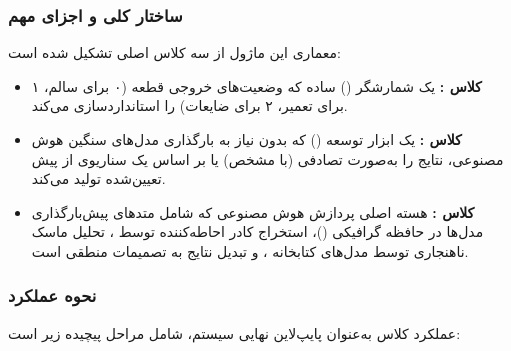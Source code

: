 \documentclass{article}
\begin{document}
\subsubsection{ساختار کلی و اجزای مهم}
معماری این ماژول از سه کلاس اصلی تشکیل شده است:

\begin{itemize}
	\item \textbf{کلاس :} یک شمارشگر () ساده که وضعیت‌های خروجی قطعه (۰ برای سالم، ۱ برای تعمیر، ۲ برای ضایعات) را استانداردسازی می‌کند.
	\item \textbf{کلاس :} یک ابزار توسعه () که بدون نیاز به بارگذاری مدل‌های سنگین هوش مصنوعی، نتایج را به‌صورت تصادفی (با  مشخص) یا بر اساس یک سناریوی از پیش تعیین‌شده تولید می‌کند.
	\item \textbf{کلاس :} هسته اصلی پردازش هوش مصنوعی که شامل متدهای پیش‌بارگذاری مدل‌ها در حافظه گرافیکی ()، استخراج کادر احاطه‌کننده توسط ، تحلیل ماسک ناهنجاری توسط مدل‌های کتابخانه ، و تبدیل نتایج به تصمیمات منطقی است.
\end{itemize}

\subsubsection{نحوه عملکرد}
عملکرد کلاس  به‌عنوان پایپ‌لاین نهایی سیستم، شامل مراحل پیچیده زیر است:
\end{document}

